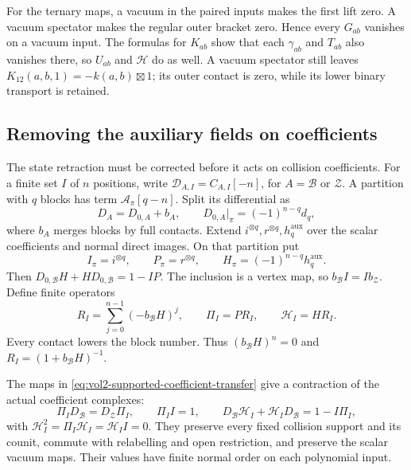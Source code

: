 For the ternary maps, a vacuum in the paired inputs makes
the first lift zero. A vacuum spectator makes the regular
outer bracket zero. Hence every $G_{ab}$ vanishes on a
vacuum input. The formulas for $K_{ab}$ show that each
$\gamma_{ab}$ and $T_{ab}$ also vanishes there, so $U_{ab}$
and $\mathcal H$ do as well. A vacuum spectator still leaves
$K_{12}(a,b,1)=-k(a,b)\boxtimes1$; its outer contact is zero,
while its lower binary transport is retained.

\subsection{Removing the auxiliary fields on coefficients}

The state retraction must be corrected before it acts on
collision coefficients. For a finite set $I$ of $n$ positions,
write $\mathcal D_{A,I}=C_{A,I}[-n]$, for $A=\mathcal B$
or $\mathcal Z$. A partition with $q$ blocks has term
$\mathcal A_\pi[q-n]$. Split its differential as
\[
 D_A=D_{0,A}+b_A,\qquad
 D_{0,A}|_\pi=(-1)^{n-q}d_q,
\]
where $b_A$ merges blocks by full contacts.
Extend $i^{\otimes q},r^{\otimes q},h_q^{\mathrm{aux}}$
over the scalar coefficients and normal direct images.
On that partition put
\[
 I_\pi=i^{\otimes q},\qquad P_\pi=r^{\otimes q},\qquad
 H_\pi=(-1)^{n-q}h_q^{\mathrm{aux}}.
\]
Then $D_{0,\mathcal B}H+HD_{0,\mathcal B}=1-IP$.
The inclusion is a vertex map, so $b_{\mathcal B}I=Ib_{\mathcal Z}$.
Define finite operators
\begin{equation}\label{eq:vol2-supported-coefficient-transfer}
 R_I=\sum_{j=0}^{n-1}(-b_{\mathcal B}H)^j,
 \qquad \Pi_I=PR_I,\qquad \mathcal H_I=HR_I.
\end{equation}
Every contact lowers the block number. Thus
$(b_{\mathcal B}H)^n=0$ and $R_I=(1+b_{\mathcal B}H)^{-1}$.

\begin{proposition}\label{prop:vol2-supported-coefficient-transfer}
The maps in \eqref{eq:vol2-supported-coefficient-transfer}
give a contraction of the actual coefficient complexes:
\[
 \Pi_ID_{\mathcal B}=D_{\mathcal Z}\Pi_I,\qquad
 \Pi_II=1,\qquad
 D_{\mathcal B}\mathcal H_I+\mathcal H_ID_{\mathcal B}=1-I\Pi_I,
\]
with $\mathcal H_I^2=\Pi_I\mathcal H_I=\mathcal H_II=0$.
They preserve every fixed collision support and its counit,
commute with relabelling and open restriction, and preserve
the scalar vacuum maps. Their values have finite normal order
on each polynomial input.
\end{proposition}

